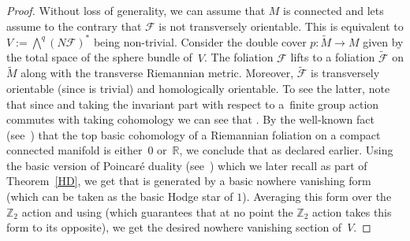 \documentclass[10pt,a4paper]{amsart}
\numberwithin{equation}{section}
\theoremstyle{definition}
\begin{document}
\begin{proof} Without loss of generality, we can assume that $M$ is connected and lets assume to the contrary that $\mathcal{F}$ is not transversely orientable. This is equivalent to $V:=\bigwedge^q (N\mathcal{F})^*$ being non-trivial. Consider the double cover $p\colon \tilde{M}\to M$ given by the total space of the sphere bundle of~$V$. The foliation $\mathcal{F}$ lifts to a foliation $\tilde{\mathcal{F}}$ on $\tilde{M}$ along with the transverse Riemannian metric. Moreover, $\tilde{\mathcal{F}}$ is transversely orientable (since  is trivial) and homologically orientable. To see the latter, note that since  and taking the invariant part with respect to a~finite group action commutes with taking cohomology we can see that . By the well-known fact (see~\cite{E1}) that the top basic cohomology of a Riemannian foliation on a compact connected manifold is either~$0$ or~$\mathbb{R}$, we conclude that  as declared earlier. Using the basic version of Poincar\'e duality (see~\cite{E1}) which we later recall as part of Theorem~\ref{HD}, we get that  is generated by a basic nowhere vanishing form (which can be taken as the basic Hodge star of $1$). Averaging this form over the $\mathbb{Z}_2$ action and using  (which guarantees that at no point the $\mathbb{Z}_2$ action takes this form to its opposite), we get the desired nowhere vanishing section of~$V$.
\end{proof}
\end{document}
